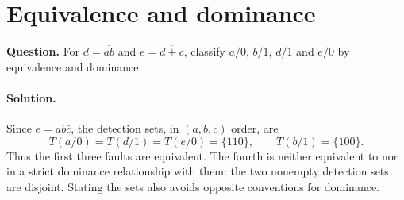 \documentclass[11pt]{article}
\newcommand{\sol}{\paragraph{Solution.}}
\begin{document}
\section{Equivalence and dominance}
\textbf{Question.} For $d=\overline{ab}$ and $e=\overline{d+c}$, classify
$a/0$, $b/1$, $d/1$ and $e/0$ by equivalence and dominance.
\begin{center}\end{center}

\sol Since $e=ab\bar c$, the detection sets, in $(a,b,c)$ order, are
\[
T(a/0)=T(d/1)=T(e/0)=\{110\},\qquad T(b/1)=\{100\}.
\]
Thus the first three faults are equivalent. The fourth is neither equivalent to
nor in a strict dominance relationship with them: the two nonempty detection
sets are disjoint. Stating the sets also avoids opposite conventions for dominance.
\end{document}
